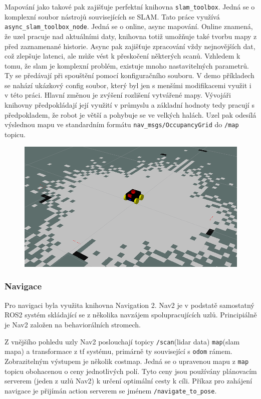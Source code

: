 Mapování jako takové pak zajišťuje perfektní knihovna \verb|slam_toolbox|. Jedná se o komplexní soubor nástrojů souvisejících se SLAM. Tato práce využívá \verb|async_slam_toolbox_node|. Jedná se o online, async mapování. Online znamená, že uzel pracuje nad aktuálními daty, knihovna totiž umožňuje také tvorbu mapy z před zaznamenané historie. Async pak zajišťuje zpracování vždy nejnovějších dat, což zlepšuje latenci, ale může vést k přeskočení některých scanů. Vzhledem k tomu, že slam je komplexní problém, existuje mnoho nastavitelných parametrů. Ty se předávají při spouštění pomocí konfiguračního souboru. V demo příkladech se nahází ukázkový config soubor, který byl jen s menšími modifikacemi využit i v této práci. Hlavní změnou je zvýšení rozlišení vytvářené mapy. Vývojáři knihovny předpokládají její využití v průmyslu a základní hodnoty tedy pracují s předpokladem, že robot je větší a pohybuje se ve velkých halách. Uzel pak odesílá výslednou mapu ve standardním formátu \verb|nav_msgs/OccupancyGrid| do \verb|/map| topicu.

\begin{figure}[h!]
	\centering
	\includegraphics[scale=0.4]{obrazky-figures/slam.png}
	\caption{}
	\label{}
\end{figure}

\subsubsection*{Navigace}
Pro navigaci byla využita knihovna Navigation 2. Nav2 je v podstatě samostatný ROS2 systém skládající se z několika navzájem spolupracujících uzlů. Principiálně je Nav2 založen na behaviorálních stromech.

Z vnějšího pohledu uzly Nav2 poslouchají topicy \verb|/scan|(lidar data) \verb|map|(slam mapa) a transformace z tf systému, primárně ty související s \verb|odom| rámem. Zobrazitelným výstupem je několik costmap. Jedná se o upravenou mapu z \verb|map| topicu obohacenou o ceny jednotlivých polí. Tyto ceny jsou používány plánovacím serverem (jeden z uzlů Nav2) k určení optimální cesty k cíli. Příkaz pro zahájení navigace je přijímán action serverem se jménem \verb|/navigate_to_pose|. 

